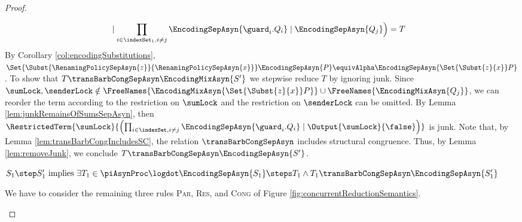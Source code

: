 \documentclass[]{llncs}
\begin{document}
\begin{proof}
\begin{description}
\begin{description}
\begin{align*}
{\begin{aligned}[t]
								& \mid \prod_{i \in \indexSet_1, i \neq j} \EncodingSepAsyn{\guard_i.Q_i} \mid \EncodingSepAsyn{Q_j} \Big) = T
							\end{aligned}}
					\end{align*}
					By Corollary \ref{col:encodingSubstitutions}, $ \Set{ \Subst{\RenamingPolicySepAsyn{z}}{\RenamingPolicySepAsyn{x}} } \EncodingSepAsyn{P} \equivAlpha \EncodingSepAsyn{\Set{ \Subst{z}{x} } P}  $. To show that $ T \transBarbCongSepAsyn \EncodingMixAsyn{S'} $ we stepwise reduce $ T $ by ignoring junk. Since $ \sumLock, \senderLock \notin \FreeNames{\EncodingMixAsyn{\Set{ \Subst{z}{x} } P}} \cup \FreeNames{\EncodingMixAsyn{Q_j}} $, we can reorder the term according to the restriction on $ \sumLock $ and the restriction on $ \senderLock $ can be omitted. By Lemma \ref{lem:junkRemainsOfSumsSepAsyn}, then $ \RestrictedTerm{\sumLock}{\left( \prod_{i \in \indexSet, i \neq j} \EncodingSepAsyn{\guard_i.Q_i} \mid \Output{\sumLock}{\false} \right)} $ is junk. Note that, by Lemma \ref{lem:transBarbCongIncludesSC}, the relation $ \transBarbCongSepAsyn $ includes structural congruence. Thus, by Lemma \ref{lem:removeJunk}, we conclude $ T \transBarbCongSepAsyn \EncodingSepAsyn{S'} $.
			\end{description}
		\item[Induction Hypothesis:] $ S_1 \step S_1' \text{ implies } \exists T_1 \in \piAsynProc \logdot \EncodingSepAsyn{S_1} \steps T_1 \wedge T_1 \transBarbCongSepAsyn \EncodingSepAsyn{S_1'} $
		\item[Induction Step:] We have to consider the remaining three rules \textsc{Par}, \textsc{Res}, and \textsc{Cong} of Figure \ref{fig:concurrentReductionSemantics}.
			\begin{description}

\end{description}
\end{description}
\end{proof}
\end{document}

